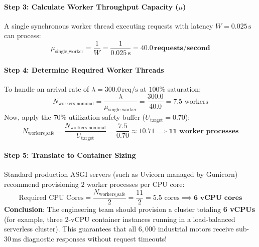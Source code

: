 \begin{example}
\paragraph{Step 3: Calculate Worker Throughput Capacity ($\mu$)}
A single synchronous worker thread executing requests with latency $W = 0.025\,\text{s}$ can process:
\begin{equation*}
\mu_{\text{single\_worker}} = \frac{1}{W} = \frac{1}{0.025\,\text{s}} = \mathbf{40.0\,\text{requests/second}}
\end{equation*}

\paragraph{Step 4: Determine Required Worker Threads}
To handle an arrival rate of $\lambda = 300.0\,\text{req/s}$ at $100\%$ saturation:
\begin{equation*}
N_{\text{workers\_nominal}} = \frac{\lambda}{\mu_{\text{single\_worker}}} = \frac{300.0}{40.0} = 7.5 \text{ workers}
\end{equation*}
Now, apply the $70\%$ utilization safety buffer ($U_{\text{target}} = 0.70$):
\begin{equation*}
N_{\text{workers\_safe}} = \frac{N_{\text{workers\_nominal}}}{U_{\text{target}}} = \frac{7.5}{0.70} \approx 10.71 \implies \mathbf{11 \text{ worker processes}}
\end{equation*}

\paragraph{Step 5: Translate to Container Sizing}
Standard production ASGI servers (such as Uvicorn managed by Gunicorn) recommend provisioning $2$ worker processes per CPU core:
\begin{equation*}
\text{Required CPU Cores} = \frac{N_{\text{workers\_safe}}}{2} = \frac{11}{2} = 5.5 \text{ cores} \implies \mathbf{6 \text{ vCPU cores}}
\end{equation*}
\textbf{Conclusion}: The engineering team should provision a cluster totaling \textbf{6 vCPUs} (for example, three 2-vCPU container instances running in a load-balanced serverless cluster). This guarantees that all $6{,}000$ industrial motors receive sub-$30\,\text{ms}$ diagnostic responses without request timeouts!
\end{example}

